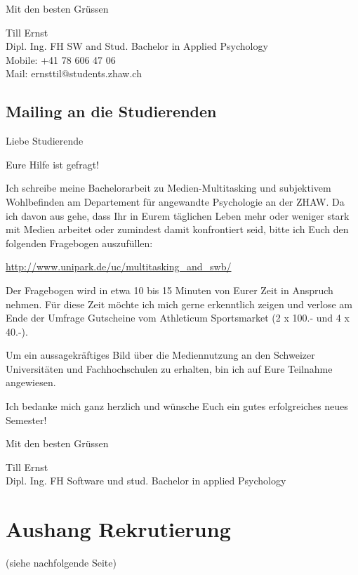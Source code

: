\begin{RaggedRight}
Mit den besten Grüssen

Till Ernst\\
Dipl. Ing. FH SW and Stud. Bachelor in Applied Psychology\\
Mobile: +41 78 606 47 06\\
Mail:  ernsttil@students.zhaw.ch 

\subsection{Mailing an die Studierenden}
Liebe Studierende

Eure Hilfe ist gefragt!

Ich schreibe meine Bachelorarbeit zu Medien-Multitasking und subjektivem Wohlbefinden am Departement für angewandte Psychologie an der ZHAW. Da ich davon aus gehe, dass Ihr in Eurem täglichen Leben mehr oder weniger stark mit Medien arbeitet oder zumindest damit konfrontiert seid, bitte ich Euch den folgenden Fragebogen auszufüllen:

\url{http://www.unipark.de/uc/multitasking_and_swb/}

Der Fragebogen wird in etwa 10 bis 15 Minuten von Eurer Zeit in Anspruch nehmen. Für diese Zeit möchte ich mich gerne erkenntlich zeigen und verlose am Ende der Umfrage Gutscheine vom Athleticum Sportsmarket (2 x 100.- und 4 x 40.-).

Um ein aussagekräftiges Bild über die Mediennutzung an den Schweizer Universitäten und Fachhochschulen zu erhalten, bin ich auf Eure Teilnahme angewiesen.

Ich bedanke mich ganz herzlich und wünsche Euch ein gutes erfolgreiches neues Semester!

Mit den besten Grüssen

Till Ernst\\
Dipl. Ing. FH Software und stud. Bachelor in applied Psychology

\section{Aushang Rekrutierung}\label{appendix.aushang}
(siehe nachfolgende Seite)


\end{RaggedRight}